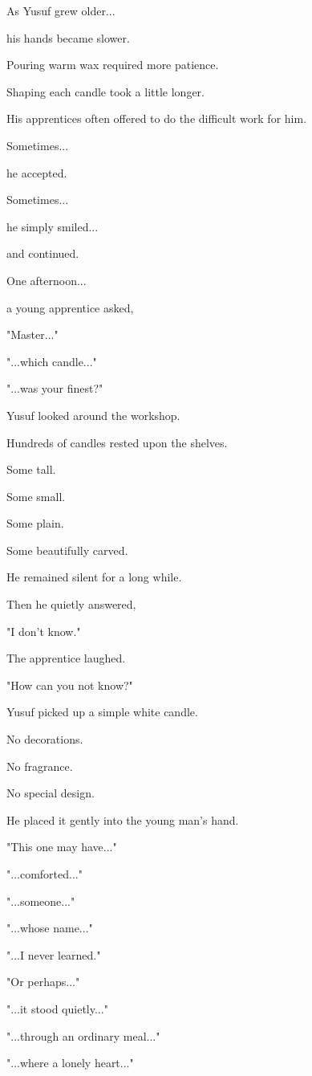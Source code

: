 \documentclass[12pt,openany]{book}
\begin{document}
As Yusuf grew older...

his hands became slower.

Pouring warm wax required more patience.

Shaping each candle took a little longer.

His apprentices often offered to do the difficult work for him.

Sometimes...

he accepted.

Sometimes...

he simply smiled...

and continued.

One afternoon...

a young apprentice asked,

"Master..."

"...which candle..."

"...was your finest?"

Yusuf looked around the workshop.

Hundreds of candles rested upon the shelves.

Some tall.

Some small.

Some plain.

Some beautifully carved.

He remained silent for a long while.

Then he quietly answered,

"I don't know."

The apprentice laughed.

"How can you not know?"

Yusuf picked up a simple white candle.

No decorations.

No fragrance.

No special design.

He placed it gently into the young man's hand.

"This one may have..."

"...comforted..."

"...someone..."

"...whose name..."

"...I never learned."

"Or perhaps..."

"...it stood quietly..."

"...through an ordinary meal..."

"...where a lonely heart..."
\end{document}
